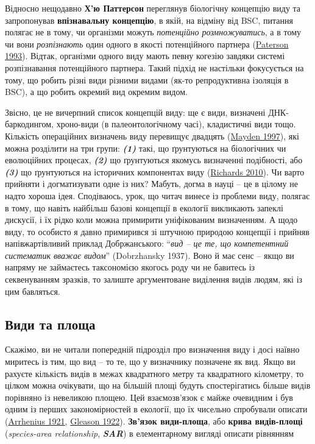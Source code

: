 \documentclass[
  11pt,
]{book}
\begin{document}
Відносно нещодавно \textbf{Х'ю Паттерсон} переглянув біологічну концепцію виду та запропонував \textbf{впізнавальну концепцію}, в якій, на відміну від BSC, питання полягає не в тому, чи організми можуть \emph{потенційно розмножуватись}, а в тому чи вони \emph{розпізнають} один одного в якості потенційного партнера (\href{https://books.google.com/books/about/Evolution_and_the_Recognition_Concept_of.html?id=ayQUAQAAIAAJ}{Paterson 1993}). Відтак, організми одного виду мають певну когезію завдяки системі розпізнавання потенційного партнера. Такий підхід не настільки фокусується на тому, що робить різні види різними видами (як-то репродуктивна ізоляція в BSC), а що робить окремий вид окремим видом.

Звісно, це не вичерпний список концепцій виду: ще є види, визначені ДНК-баркодингом, хроно-види (в палеонтологічному часі), кладистичні види тощо. Кількість операційних визначень виду перевищує двадцять (\href{https://philpapers.org/rec/mayaho-6}{Mayden 1997}), які можна розділити на три групи: \textbf{\emph{(1)}} такі, що ґрунтуються на біологічних чи еволюційних процесах, \textbf{\emph{(2)}} що ґрунтуються якомусь визначенні подібності, або \textbf{\emph{(3)}} що ґрунтуються на історичних компонентах виду (\href{https://doi.org/10.1017/CBO9780511762222}{Richards 2010}). Чи варто прийняти і догматизувати одне із них? Мабуть, догма в науці -- це в цілому не надто хороша ідея. Сподіваюсь, урок, що читач винесе із проблеми виду, полягає в тому, що навіть найбільш базові концепції в екології викликають запеклі дискусії, і їх рідко коли можна примирити уніфікованим визначенням. А щодо виду, то особисто я давно примирився зі штучною природою концепції і прийняв напівжартівливий приклад Добржанського: ``\emph{вид -- це те, що компетентний систематик вважає видом}'' (Dobrzhansky 1937). Воно й має сенс -- якщо ви напряму не займаєтесь таксономією якогось роду чи не бавитесь із секвенуванням зразків, то залиште аргументоване виділення видів людям, які із цим бавляться.

\subsection{Види та площа}\label{ux432ux438ux434ux438-ux442ux430-ux43fux43bux43eux449ux430}

Скажімо, ви не читали попередній підрозділ про визначення виду і досі наївно миритесь із тим, що вид -- то те, що у визначнику позначене як вид. Якщо ви рахуєте кількість видів в межах квадратного метру та квадратного кілометру, то цілком можна очікувати, що на більшій площі будуть спостерігатись більше видів порівняно із невеликою площею. Цей взаємозв'язок є майже очевидним і був одним із перших закономірностей в екології, що їх чисельно спробували описати (\href{https://doi.org/10.2307/2255763}{Arrhenius 1921}, \href{https://doi.org/10.2307/1929150}{Gleason 1922}). \textbf{Зв'язок види-площа}, або \textbf{крива видів-площі} (\emph{species-area relationship}, \textbf{\emph{SAR}}) в елементарному вигляді описати рівнянням
\end{document}
